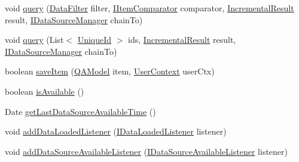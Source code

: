 \begin{DoxyCompactItemize}
\item 
void \hyperlink{interfacecom_1_1ualberta_1_1team17_1_1datamanager_1_1_i_data_source_manager_ac7a879658eeee8d593f2485cca1eb0dc}{query} (\hyperlink{classcom_1_1ualberta_1_1team17_1_1datamanager_1_1_data_filter}{Data\+Filter} filter, \hyperlink{interfacecom_1_1ualberta_1_1team17_1_1datamanager_1_1_i_item_comparator}{I\+Item\+Comparator} comparator, \hyperlink{classcom_1_1ualberta_1_1team17_1_1datamanager_1_1_incremental_result}{Incremental\+Result} result, \hyperlink{interfacecom_1_1ualberta_1_1team17_1_1datamanager_1_1_i_data_source_manager}{I\+Data\+Source\+Manager} chain\+To)
\item 
void \hyperlink{interfacecom_1_1ualberta_1_1team17_1_1datamanager_1_1_i_data_source_manager_a1d0ac508e9d0f33b291b8be46c2a2f96}{query} (List$<$ \hyperlink{classcom_1_1ualberta_1_1team17_1_1_unique_id}{Unique\+Id} $>$ ids, \hyperlink{classcom_1_1ualberta_1_1team17_1_1datamanager_1_1_incremental_result}{Incremental\+Result} result, \hyperlink{interfacecom_1_1ualberta_1_1team17_1_1datamanager_1_1_i_data_source_manager}{I\+Data\+Source\+Manager} chain\+To)
\item 
boolean \hyperlink{interfacecom_1_1ualberta_1_1team17_1_1datamanager_1_1_i_data_source_manager_ab1bad9920404b544ab21c5fe0db95c25}{save\+Item} (\hyperlink{classcom_1_1ualberta_1_1team17_1_1_q_a_model}{Q\+A\+Model} item, \hyperlink{classcom_1_1ualberta_1_1team17_1_1datamanager_1_1_user_context}{User\+Context} user\+Ctx)
\item 
boolean \hyperlink{interfacecom_1_1ualberta_1_1team17_1_1datamanager_1_1_i_data_source_manager_a2aa4868fa969b01da83cb0b24539211a}{is\+Available} ()
\item 
Date \hyperlink{interfacecom_1_1ualberta_1_1team17_1_1datamanager_1_1_i_data_source_manager_ad80da18847572438e4a8bc7e3d14dc57}{get\+Last\+Data\+Source\+Available\+Time} ()
\item 
void \hyperlink{interfacecom_1_1ualberta_1_1team17_1_1datamanager_1_1_i_data_source_manager_aad54dc81d6cdb9f9f2314d91077b51ae}{add\+Data\+Loaded\+Listener} (\hyperlink{interfacecom_1_1ualberta_1_1team17_1_1datamanager_1_1_i_data_loaded_listener}{I\+Data\+Loaded\+Listener} listener)
\item 
void \hyperlink{interfacecom_1_1ualberta_1_1team17_1_1datamanager_1_1_i_data_source_manager_a645499d22747b6f06c72e07cee7c74be}{add\+Data\+Source\+Available\+Listener} (\hyperlink{interfacecom_1_1ualberta_1_1team17_1_1datamanager_1_1_i_data_source_available_listener}{I\+Data\+Source\+Available\+Listener} listener)
\end{DoxyCompactItemize}


